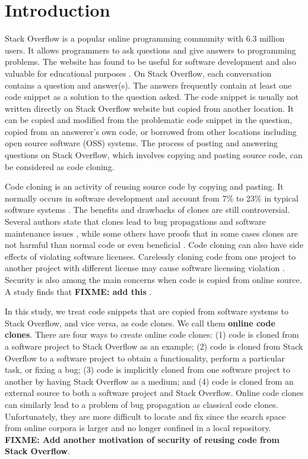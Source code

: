 \documentclass{sig-alternate-05-2015}
\newcommand\FIXME[1]{\textbf{FIXME: #1}}
\begin{document}
\section{Introduction}
Stack Overflow is a popular online programming community with 6.3 million users. It allows programmers to ask questions and give answers to programming problems. The website has found to be useful for software development and also valuable for educational purposes \cite{x}. On Stack Overflow, each conversation contains a question and answer(s).  The answers frequently contain at least one code snippet as a solution to the question asked. The code snippet is usually not written directly on Stack Overflow website but copied from another location. It can be copied and modified from the problematic code snippet in the question, copied from an answerer's own code, or borrowed from other locations including open source software (OSS) systems. The process of posting and answering questions on Stack Overflow, which involves copying and pasting source code, can be considered as code cloning. 

Code cloning is an activity of reusing source code by copying and pasting. It normally occurs in software development and account from 7\% to 23\% in typical software systems \cite{Bellon2007}. The benefits and drawbacks of clones are still controversial. Several authors state that clones lead to bug propagations and software maintenance issues \cite{Kamiya2002}, while some others have proofs that in some cases clones are not harmful than normal code or even beneficial \cite{Saini2016,Kapser2006}. Code cloning can also have side effects of violating software licenses. Carelessly cloning code from one project to another project with different license may cause software licensing violation \cite{German2009}. Security is also among the main concerns when code is copied from online source. A study finds that \FIXME{add this} \cite{Acar2016}.

In this study, we treat code snippets that are copied from software systems to Stack Overflow, and vice versa, as code clones. We call them \textbf{online code clones}. There are four ways to create online code clones: (1) code is cloned from a software project to Stack Overflow as an example; (2) code is cloned from Stack Overflow to a software project to obtain a functionality, perform a particular task, or fixing a bug; (3) code is implicitly cloned from one software project to another by having Stack Overflow as a medium; and (4) code is cloned from an external source to both a software project and Stack Overflow. Online code clones can similarly lead to a problem of bug propagation as classical code clones. Unfortunately, they are more difficult to locate and fix since the search space from online corpora is larger and no longer confined in a local repository. \FIXME{Add another motivation of security of reusing code from Stack Overflow}.
\end{document}
